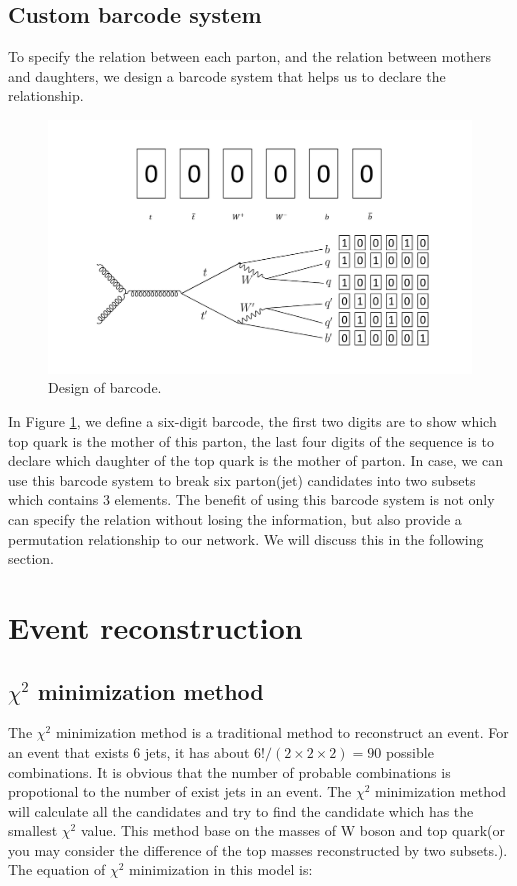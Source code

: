 \subsection{Custom barcode system}\label{subsec:barcode}
To specify the relation between each parton, and the relation between mothers and daughters, we design a barcode system that helps us to declare the relationship.
\begin{figure}[H]
	\includegraphics[width=0.8\linewidth]{Figures/barcode.pdf}
	\caption{Design of barcode.}
	\label{fig:barcode}
\end{figure}
\newpage
In Figure \ref{fig:barcode}, we define a six-digit barcode, the first two digits are to show which top quark is the mother of this parton, the last four digits of the sequence is to declare which daughter of the top quark is the mother of parton. In case, we can use this barcode system to break six parton(jet) candidates into two subsets which contains 3 elements. The benefit of using this barcode system is not only can specify the relation without losing the information, but also provide a permutation relationship to our network. We will discuss this in the following section.

\section{Event reconstruction}\label{sec:Event reconstruction}

\subsection{$\chi^{2}$ minimization method}\label{subsec:chi-square}

The $\chi^{2}$ minimization method is a traditional method to reconstruct an event. For an event that exists 6 jets, it has about $6!/(2\times2\times2)=90$ possible combinations. It is obvious that the number of probable combinations is propotional to the number of exist jets in an event. The $\chi^{2}$ minimization method will calculate all the candidates and try to find the candidate which has the smallest $\chi^{2}$ value. This method base on the masses of W boson and top quark(or you may consider the difference of the top masses reconstructed by two subsets.). The equation of $\chi^{2}$ minimization in this model is:

